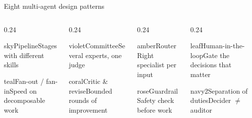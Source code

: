 \documentclass[aspectratio=169,11pt]{beamer}
\newcommand{\pat}[3]{\begin{card}{#1}{#2}#3\end{card}}
\begin{document}

\begin{frame}{Eight multi-agent design patterns}
\vspace{1mm}
\begin{columns}[T]
\begin{column}{0.24\textwidth}\pat{sky}{Pipeline}{Stages with different skills}\pat{teal}{Fan-out / fan-in}{Speed on decomposable work}\end{column}
\begin{column}{0.24\textwidth}\pat{violet}{Committee}{Several experts, one judge}\pat{coral}{Critic \& revise}{Bounded rounds of improvement}\end{column}
\begin{column}{0.24\textwidth}\pat{amber}{Router}{Right specialist per input}\pat{rose}{Guardrail}{Safety check before work}\end{column}
\begin{column}{0.24\textwidth}\pat{leaf}{Human-in-the-loop}{Gate the decisions that matter}\pat{navy2}{Separation of duties}{Decider $\neq$ auditor}\end{column}
\end{columns}
\vspace{1mm}
\end{frame}
\end{document}
